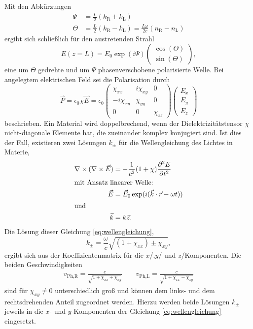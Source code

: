 Mit den Abkürzungen
\begin{align}
    \Psi &= \frac{L}{2} (k_\text{R}+k_\text{L})\\
    \Theta &= \frac{L}{2} (k_\text{R}-k_\text{L}) = \frac{L\omega}{2 c} (n_\text{R}-n_\text{L}) \label{eq:abk_theta}
\end{align}
ergibt sich schließlich für den austretenden Strahl
\begin{equation}
    E(z=L) = E_0 \exp(i\Psi)\begin{pmatrix} \cos(\Theta)\\\sin(\Theta)\end{pmatrix},
\end{equation}
eine um $\Theta$ gedrehte und um $\Psi$ phasenverschobene polarisierte Welle.
Bei angelegtem elektrischen Feld sei die Polarisation durch
\begin{equation}
    \vec P = \epsilon_0 \chi \vec E = \epsilon_0 \begin{pmatrix} \chi_{xx} & i\chi_{xy} & 0 \\ -i\chi_{xy} & \chi_{yy} & 0 \\ 0 & 0 & \chi_{zz} \end{pmatrix} \begin{pmatrix} E_x\\E_y\\E_z \end{pmatrix}
    \label{eq:polarisation}
\end{equation}
beschrieben.
Ein Material wird doppelbrechend, wenn der Dielektrizitätstensor $\chi$ nicht-diagonale Elemente hat, die zueinander komplex konjugiert sind.
Ist dies der Fall, existieren zwei Lösungen $k_{\pm}$ für die Wellengleichung des Lichtes in Materie,
\begin{align}
    \nabla\times(\nabla\times\vec E) &= -\frac{1}{c^2}(1+\chi)\frac{\partial^2 E}{\partial t^2}\label{eq:wellengleichung}\\
    \intertext{mit Ansatz linearer Welle:}
    \vec E &= \vec E_0 \exp(i(\vec k \cdot \vec r - \omega t))\\
    \shortintertext{und}
    \vec k &= k \vec z.
\end{align}
Die Lösung dieser Gleichung \eqref{eq:wellengleichung},
\begin{equation}
    k_\pm = \frac{\omega}{c}\sqrt{(1+\chi_{xx})\pm\chi_{xy}},
\end{equation}
ergibt sich aus der Koeffizientenmatrix für die $x$\-/,$y$\-/ und $z$\-/Komponenten.
Die beiden Geschwindigkeiten
\begin{align}
    v_\text{Ph,R}=\frac{c}{\sqrt{1+\chi_{xx}+\chi_{xy}}} \qquad v_\text{Ph,L}=\frac{c}{\sqrt{1+\chi_{xx}-\chi_{xy}}}
\end{align}
sind für $\chi_{xy}\neq0$ unterschiedlich groß und können dem links- und dem rechtsdrehenden Anteil zugeordnet werden.
Hierzu werden beide Lösungen $k_\pm$ jeweils in die $x$- und $y$-Komponenten der Gleichung \eqref{eq:wellengleichung}
eingesetzt.

